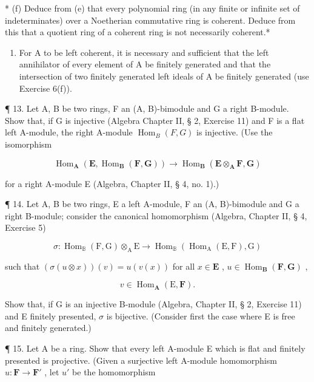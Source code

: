 * (f) Deduce from (e) that every polynomial ring (in any finite or infinite set of indeterminates) over a Noetherian commutative ring is coherent. Deduce from this that a quotient ring of a coherent ring is not necessarily coherent.*

\begin{enumerate}
\def\labelenumi{(\alph{enumi})}
\setcounter{enumi}{6}
\tightlist
\item
  For A to be left coherent, it is necessary and sufficient that the left annihilator of every element of A be finitely generated and that the intersection of two finitely generated left ideals of A be finitely generated (use Exercise 6(f)).
\end{enumerate}

¶ 13. Let A, B be two rings, F an (A, B)-bimodule and G a right B-module. Show that, if G is injective (Algebra Chapter II, § 2, Exercise 11) and F is a flat left A-module, the right A-module \(\operatorname{Hom}_{B}(F, G)\) is injective. (Use the isomorphism

\[
\operatorname{Hom} _ {\mathbf {A}} (\mathbf {E}, \operatorname{Hom} _ {\mathbf {B}} (\mathbf {F}, \mathbf {G})) \rightarrow \operatorname{Hom} _ {\mathbf {B}} (\mathbf {E} \otimes_ {\mathbf {A}} \mathbf {F}, \mathbf {G})
\]

for a right A-module E (Algebra, Chapter II, § 4, no. 1).)

¶ 14. Let A, B be two rings, E a left A-module, F an (A, B)-bimodule and G a right B-module; consider the canonical homomorphism (Algebra, Chapter II, § 4, Exercise 5)

\[
\sigma \colon \operatorname{Hom} _ {\mathbb {B}} (\mathrm{F}, \mathrm{G}) \otimes_ {\mathrm{A}} \mathrm{E} \rightarrow \operatorname{Hom} _ {\mathbb {B}} (\operatorname{Hom} _ {\mathrm{A}} (\mathrm{E}, \mathrm{F}), \mathrm{G})
\]

such that \((\sigma(u \otimes x))(v) = u(v(x))\) for all \(x \in \mathbf{E}\) , \(u \in \operatorname{Hom}_{\mathbf{B}}(\mathbf{F}, \mathbf{G})\) ,

\[
v \in \operatorname{Hom} _ {\mathbf {A}} (\mathrm{E}, \mathbf {F}).
\]

Show that, if G is an injective B-module (Algebra, Chapter II, § 2, Exercise 11) and E finitely presented, \(\sigma\) is bijective. (Consider first the case where E is free and finitely generated.)

¶ 15. Let A be a ring. Show that every left A-module E which is flat and finitely presented is projective. (Given a surjective left A-module homomorphism \(u: \mathbf{F} \to \mathbf{F}'\) , let \(u'\) be the homomorphism

